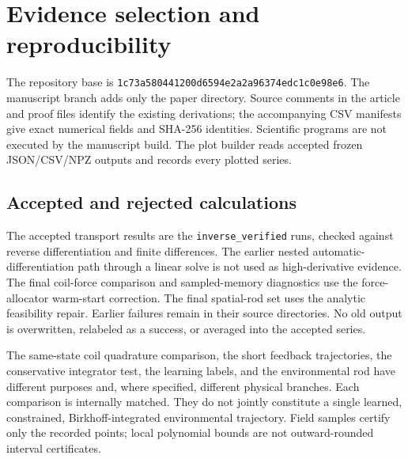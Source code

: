 \section{Evidence selection and reproducibility}
The repository base is \texttt{1c73a580441200d6594e2a2a96374edc1c0e98e6}. The manuscript branch adds only the paper directory. Source comments in the article and proof files identify the existing derivations; the accompanying CSV manifests give exact numerical fields and SHA-256 identities. Scientific programs are not executed by the manuscript build. The plot builder reads accepted frozen JSON/CSV/NPZ outputs and records every plotted series.

\subsection{Accepted and rejected calculations}
The accepted transport results are the \texttt{inverse\_verified} runs, checked against reverse differentiation and finite differences. The earlier nested automatic-differentiation path through a linear solve is not used as high-derivative evidence. The final coil-force comparison and sampled-memory diagnostics use the force-allocator warm-start correction. The final spatial-rod set uses the analytic feasibility repair. Earlier failures remain in their source directories. No old output is overwritten, relabeled as a success, or averaged into the accepted series.

The same-state coil quadrature comparison, the short feedback trajectories, the conservative integrator test, the learning labels, and the environmental rod have different purposes and, where specified, different physical branches. Each comparison is internally matched. They do not jointly constitute a single learned, constrained, Birkhoff-integrated environmental trajectory. Field samples certify only the recorded points; local polynomial bounds are not outward-rounded interval certificates.

